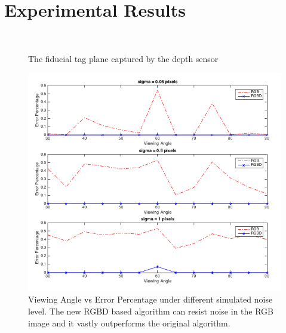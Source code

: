 \section{Experimental Results}

\begin{figure}[h]
 \\
\caption{The fiducial tag plane captured by the depth sensor}
\label{fig:exp_setup}
\end{figure}

\begin{figure}[h]
\centering
\includegraphics[width=\columnwidth]{figs/viewing_angle_fig1}
\caption{Viewing Angle vs Error Percentage under different simulated noise level. The new RGBD based algorithm can resist noise in the RGB image and it vastly outperforms the original algorithm.}
\label{fig:viewing_result}
\end{figure}

